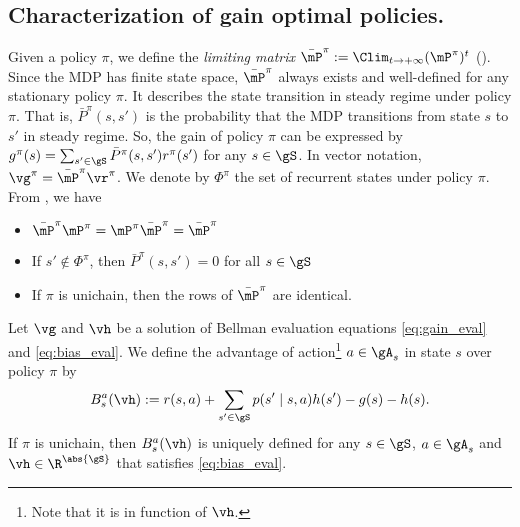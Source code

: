 
\subsection{Characterization of gain optimal policies.}

Given a policy $\pi$, we define the \emph{limiting matrix} $\bar{\mP}^\pi:=\Clim_{t\to+\infty}{(\mP^\pi)^t}$ (\cite[Appendix~A.4]{puterman2014markov}). %
Since the MDP has finite state space, $\bar{\mP}^\pi$ always exists and well-defined for any stationary policy $\pi$.
It describes the state transition in steady regime under policy $\pi$.
That is, $\bar{P}^\pi(s,s')$ is the probability that the MDP transitions from state $s$ to $s'$ in steady regime.
So, the gain of policy $\pi$ can be expressed by $g^\pi(s)=\sum_{s'\in\gS}\bar{P}^\pi(s,s')r^\pi(s')$ for any $s\in\gS$.
In vector notation, $\vg^\pi=\bar{\mP}^\pi\vr^\pi$.
We denote by $\Phi^\pi$ the set of recurrent states under policy $\pi$.
From \cite[Section~A.4]{puterman2014markov}, we have
\begin{itemize}
    \item $\bar{\mP}^\pi\mP^\pi =\mP^\pi\bar{\mP}^\pi =\bar{\mP}^\pi$
    \item If $s'\notin\Phi^\pi$, then $\bar{P}^\pi(s,s')=0$ for all $s\in\gS$
    \item If $\pi$ is unichain, then the rows of $\bar{\mP}^\pi$ are identical.
\end{itemize}

Let $\vg$ and $\vh$ be a solution of Bellman evaluation equations \eqref{eq:gain_eval} and \eqref{eq:bias_eval}.
We define the advantage of action\footnote{Note that it is in function of $\vh$.} $a\in\gA_s$ in state $s$ over policy $\pi$ by
\begin{equation}
    \label{eq:advan}
    B^a_s(\vh) := r(s,a) +\sum_{s'\in\gS}p(s'\mid s,a)h(s') -g(s) -h(s).
\end{equation}
If $\pi$ is unichain, then $B^a_s(\vh)$ is uniquely defined for any $s\in\gS$, $a\in\gA_s$ and $\vh\in\R^{\abs{\gS}}$ that satisfies \eqref{eq:bias_eval}.

